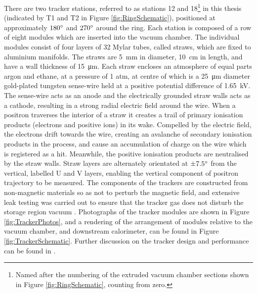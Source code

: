 There are two tracker stations, referred to as stations 12 and 18\footnote{Named after the numbering of the extruded vacuum chamber sections shown in Figure \ref{fig:RingSchematic}, counting from zero.} in this thesis (indicated by T1 and T2 in Figure \ref{fig:RingSchematic}), positioned at approximately $180\degree$ and $270\degree$ around the ring. Each station is composed of a row of eight modules which are inserted into the vacuum chamber. The individual modules consist of four layers of 32 Mylar tubes, called straws, which are fixed to aluminium manifolds. The straws are \SI{5}{\milli\metre} in diameter, \SI{10}{\centi\metre} in length, and have a wall thickness of \SI{15}{\micro\metre}. Each straw encloses an atmosphere of equal parts argon and ethane, at a pressure of 1 atm, at centre of which is a \SI{25}{\micro\metre} diameter gold-plated tungsten sense-wire held at a positive potential difference of \SI{1.65}{\kilo\volt}. The sense-wire acts as an anode and the electrically grounded straw walls acts as a cathode, resulting in a strong radial electric field around the wire. When a positron traverses the interior of a straw it creates a trail of primary ionisation products (electrons and positive ions) in its wake. Compelled by the electric field, the electrons drift towards the wire, creating an avalanche of secondary ionisation products in the process, and cause an accumulation of charge on the wire which is registered as a hit. Meanwhile, the positive ionisation products are neutralised by the straw walls. Straw layers are alternately orientated at $\pm7.5\degree$ from the vertical, labelled U and V layers, enabling the vertical component of positron trajectory to be measured. The components of the trackers are constructed from non-magnetic materials so as not to perturb the magnetic field, and extensive leak testing was carried out to ensure that the tracker gas does not disturb the storage region vacuum \cite{Charity}. Photographs of the tracker modules are shown in Figure \ref{fig:TrackerPhotos}, and a rendering of the arrangement of modules relative to the vacuum chamber, and downstream calorimeter, can be found in Figure \ref{fig:TrackerSchematic}. Further discussion on the tracker design and performance can be found in \cite{Tracker}.


